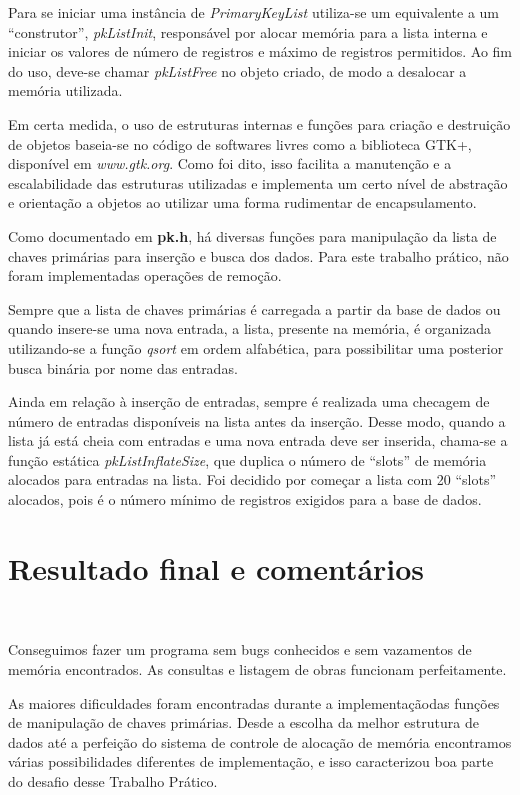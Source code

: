 \documentclass{article}
\begin{document}
Para se iniciar uma instância de \textit{PrimaryKeyList} utiliza-se um equivalente a um ``construtor'', \textit{pkListInit}, responsável por alocar memória para a lista interna e iniciar os valores de número de registros e máximo de registros permitidos. Ao fim do uso, deve-se chamar \textit{pkListFree} no objeto criado, de modo a desalocar a memória utilizada.

Em certa medida, o uso de estruturas internas e funções para criação e destruição de objetos baseia-se no código de softwares livres como a biblioteca GTK+, disponível em \textit{www.gtk.org}. Como foi dito, isso facilita a manutenção e a escalabilidade das estruturas utilizadas e implementa um certo nível de abstração e orientação a objetos ao utilizar uma forma rudimentar de encapsulamento.

Como documentado em \textbf{pk.h}, há diversas funções para manipulação da lista de chaves primárias para inserção e busca dos dados. Para este trabalho prático, não foram implementadas operações de remoção.

Sempre que a lista de chaves primárias é carregada a partir da base de dados ou quando insere-se uma nova entrada, a lista, presente na memória, é organizada utilizando-se a função \textit{qsort} em ordem alfabética, para possibilitar uma posterior busca binária por nome das entradas.

Ainda em relação à inserção de entradas, sempre é realizada uma checagem de número de entradas disponíveis na lista antes da inserção. Desse modo, quando a lista já está cheia com entradas e uma nova entrada deve ser inserida, chama-se a função estática \textit{pkListInflateSize}, que duplica o número de ``slots'' de memória alocados para entradas na lista. Foi decidido por começar a lista com 20 ``slots'' alocados, pois é o número mínimo de registros exigidos para a base de dados.

\section{Resultado final e comentários}\

Conseguimos fazer um programa sem bugs conhecidos e sem vazamentos de memória encontrados. As consultas e listagem de obras funcionam perfeitamente.

As maiores dificuldades foram encontradas durante a implementaçãodas funções de manipulação de chaves primárias. Desde a escolha da melhor estrutura de dados até a perfeição do sistema de controle de alocação de memória encontramos várias possibilidades diferentes de implementação, e isso caracterizou boa parte do desafio desse Trabalho Prático.
\end{document}
